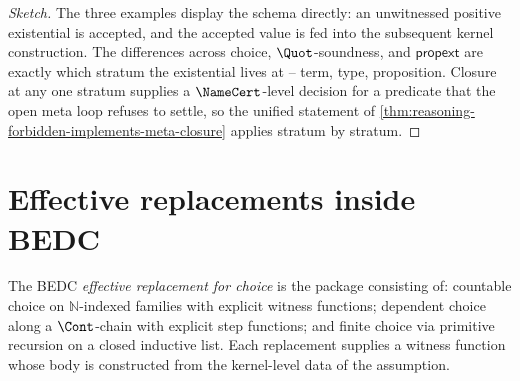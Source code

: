 \begin{proof}[Sketch]
The three examples display the schema directly: an unwitnessed positive existential is accepted, and the accepted value is fed into the subsequent kernel construction. The differences across choice, $\Quot$-soundness, and $\mathsf{propext}$ are exactly which stratum the existential lives at -- term, type, proposition. Closure at any one stratum supplies a $\NameCert$-level decision for a predicate that the open meta loop refuses to settle, so the unified statement of \autoref{thm:reasoning-forbidden-implements-meta-closure} applies stratum by stratum.
\end{proof}

\section{Effective replacements inside BEDC}
\label{sec:three-axioms-replacements}

\begin{definition}
\label{def:three-axioms-replacement-choice}
The BEDC \emph{effective replacement for choice} is the package consisting of: countable choice on $\mathbb{N}$-indexed families with explicit witness functions; dependent choice along a $\Cont$-chain with explicit step functions; and finite choice via primitive recursion on a closed inductive list. Each replacement supplies a witness function whose body is constructed from the kernel-level data of the assumption.
\end{definition}

